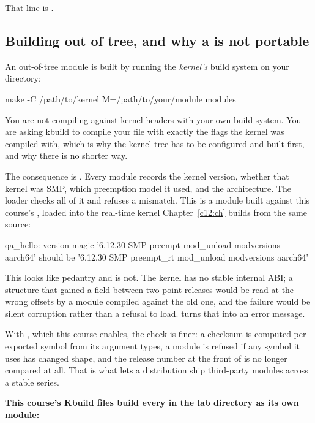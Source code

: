 \noindent That  line is .

\subsection{Building out of tree, and why a  is not portable}
\label{c4:app:a3}

An out-of-tree module is built by running the \emph{kernel's} build system on your directory:

\begin{shell}
make -C /path/to/kernel M=/path/to/your/module modules
\end{shell}

\noindent You are not compiling against kernel headers with your own build system. You are asking
kbuild to compile your file with exactly the flags the kernel was compiled with, which is why the
kernel tree has to be configured and built first, and why there is no shorter way.

The consequence is . Every module records the kernel version, whether that kernel was
SMP, which preemption model it used, and the architecture. The loader checks all of it and refuses a
mismatch. This is a module built against this course's , loaded into the
real-time kernel Chapter~\ref{c12:ch} builds from the same source:

\begin{console}
qa_hello: version magic '6.12.30 SMP preempt mod_unload modversions aarch64' should be
          '6.12.30 SMP preempt_rt mod_unload modversions aarch64'
\end{console}

\noindent This looks like pedantry and is not. The kernel has no stable internal ABI; a structure
that gained a field between two point releases would be read at the wrong offsets by a module
compiled against the old one, and the failure would be silent corruption rather than a refusal to
load.  turns that into an error message.

With , which this course enables, the check is finer: a checksum is
computed per exported symbol from its argument types, a module is refused if any symbol it uses has
changed shape, and the release number at the front of  is no longer compared at all.
That is what lets a distribution ship third-party modules across a stable series.

\textbf{This course's Kbuild files build every  in the lab directory as its own module:}

